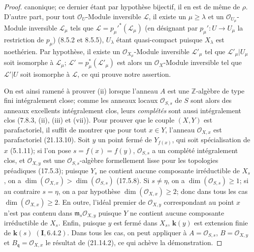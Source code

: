 \begin{proof}
canonique; ce dernier étant par hypothèse bijectif, il en est de même de $\rho$.
D'autre part, pour tout $\mathcal O_U$-Module inversible $\mathscr L$, il existe un
$\mu\geq\lambda$ et un $\mathcal O_{U_\mu}$-Module inversible $\mathscr L_\mu$ tels
que $\mathscr L=p_\mu'^*(\mathscr L_\mu)$ (en désignant par
$p_\mu':U\to U_\mu$ la restriction de $p_\mu$) (8.5.2 et 8.5.5), $U_\lambda$ étant
quasi-compact puisque $X_\lambda$ est noethérien. Par hypothèse, il existe un
$\mathcal O_{X_\mu}$-Module inversible $\mathscr L'_\mu$ tel que
$\mathscr L'_\mu|U_\mu$ soit isomorphe à $\mathscr L_\mu$;
$\mathscr L'=p_\mu^*(\mathscr L'_\mu)$ est alors un $\mathcal O_X$-Module
inversible tel que $\mathscr L'|U$ soit isomorphe à $\mathscr L$, ce qui prouve notre
assertion.

On est ainsi ramené à prouver (ii) lorsque l'anneau $A$ est une
$\mathbb Z$-algèbre de type fini intégralement close; comme les anneaux locaux
$\mathcal O_{S,s}$ de $S$ sont alors des anneaux excellents intégralement clos, leurs
\emph{complétés} sont aussi intégralement clos (7.8.3, (ii), (iii) et (vii)). Pour
prouver que le couple $(X,Y)$ est parafactoriel, il suffit de montrer que pour tout
$x\in Y$, l'anneau $\mathcal O_{X,x}$ est parafactoriel (21.13.10). Soit $y$ un point
fermé de $Y_{f(x)}$, qui soit spécialisation de $x$ (5.1.11); si l'on pose
$s=f(x)=f(y)$, $\mathcal O_{S,s}$ a un
complété intégralement clos, et $\mathcal O_{X,y}$ est une
$\mathcal O_{S,s}$-algèbre formellement lisse pour les topologies préadiques
(17.5.3); puisque $Y_s$ ne contient aucune composante irréductible de $X_s$, on a
$\dim(\mathcal O_{X,x})>\dim(\mathcal O_{S,s})$ (17.5.8). Si $s\neq\eta$, on a
$\dim(\mathcal O_{S,s})\geq1$; si au contraire $s=\eta$, on a par hypothèse
$\dim(\mathcal O_{X,x})\geq2$; donc dans tous les cas
$\dim(\mathcal O_{X,x})\geq2$. En outre, l'idéal premier de $\mathcal O_{X,y}$
correspondant au point $x$ n'est pas contenu dans
$\mathfrak m_s\mathcal O_{X,y}$ puisque $Y$ ne contient aucune composante
irréductible de $X_s$. Enfin, puisque $y$ est fermé dans $X_s$, $\boldsymbol{k}(y)$ est extension
finie de $\boldsymbol{k}(s)$ $(\mathbf I, 6.4.2)$. Dans tous les cas, on peut appliquer à
$A=\mathcal O_{S,s}$, $B=\mathcal O_{X,y}$ et
$B_\mathfrak q=\mathcal O_{X,x}$ le résultat de (21.14.2), ce qui achève la
démonstration.
\end{proof}

